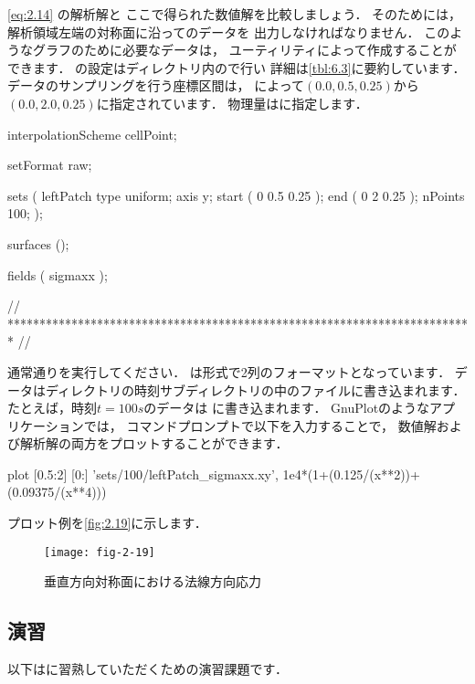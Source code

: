 \autoref{eq:2.14} の解析解と
ここで得られた数値解を比較しましょう．
そのためには，解析領域左端の対称面に沿ってのデータを
出力しなければなりません．
このようなグラフのために必要なデータは，
ユーティリティによって作成することができます．
の設定はディレクトリ内ので行い
詳細は\autoref{tbl:6.3}に要約しています．
データのサンプリングを行う座標区間は，
によって$(0.0, 0.5, 0.25)$から$(0.0, 2.0, 0.25)$に指定されています．
物理量はに指定します．
\begin{OFverbatim}[file, linenum=17]

interpolationScheme cellPoint;

setFormat       raw;

sets
(
    leftPatch
    {
        type    uniform;
        axis    y;
        start   ( 0 0.5 0.25 );
        end     ( 0 2 0.25 );
        nPoints 100;
    }
);

surfaces        ();

fields          ( sigmaxx );


// ************************************************************************* //
\end{OFverbatim}
通常通りを実行してください．
%
%
は形式で2列のフォーマットとなっています．
データはディレクトリの時刻サブディレクトリの中のファイルに書き込まれます．
たとえば，時刻$t = 100\unit{s}$のデータは
に書き込まれます．
GnuPlotのようなアプリケーションでは，
コマンドプロンプトで以下を入力することで，
数値解および解析解の両方をプロットすることができます．
\begin{OFverbatim}[terminal]
plot [0.5:2] [0:] 'sets/100/leftPatch_sigmaxx.xy',
     1e4*(1+(0.125/(x**2))+(0.09375/(x**4)))
\end{OFverbatim}
プロット例を\autoref{fig:2.19}に示します．


\begin{figure}[ht]
 \texttt{[image: fig-2-19]}
 \caption{垂直方向対称面における法線方向応力}
 \label{fig:2.19}
\end{figure}


\subsection{演習}
\label{ssec:2.2.4}
以下はに習熟していただくための演習課題です．

